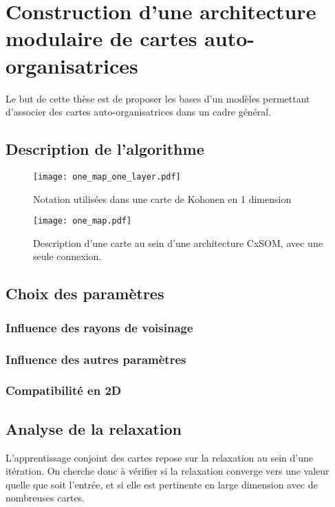 \chapter{Construction d'une architecture modulaire de cartes auto-organisatrices}
Le but de cette thèse est de proposer les bases d'un modèles permettant d'associer des cartes auto-organisatrices dans un cadre général. 


\section{Description de l'algorithme}

\begin{figure}
\texttt{[image: one\_map\_one\_layer.pdf]}
\caption{Notation utilisées dans une carte de Kohonen en 1 dimension}
\label{fig:one_map_not}
\end{figure}


\begin{figure}
\texttt{[image: one\_map.pdf]}
\caption{Description d'une carte au sein d'une architecture CxSOM, avec une seule connexion.}
\label{fig:one_map}
\end{figure}


\section{Choix des paramètres}

\subsection{Influence des rayons de voisinage}

\subsection{Influence des autres paramètres}

\subsection{Compatibilité en 2D}

\section{Analyse de la relaxation}

L'apprentissage conjoint des cartes repose sur la relaxation au sein d'une itération. On cherche donc à vérifier si la relaxation converge vers une valeur quelle que soit l'entrée, et si elle est pertinente en large dimension avec de nombreuses cartes.


